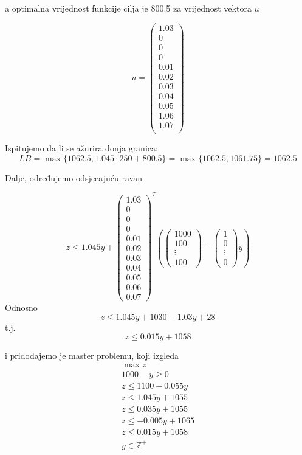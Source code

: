 \documentclass[a4paper, utf8, 11pt, colorlinks]{book}
\theoremstyle{definition}
\begin{document}
 a optimalna vrijednost funkcije cilja je 800.5 za vrijednost vektora $u$
 
 
 $$u=\left(\begin{array}{c}
 	1.03\\
 		0\\
 		0\\
 		0\\
 0.01\\
 0.02\\
 0.03\\
 0.04\\
 0.05\\
 	1.06\\
 	1.07 \\
 \end{array}\right)$$
 
 Ispitujemo da li se ažurira donja granica:
 $$LB = \max\{1062.5, 1.045\cdot 250+ 800.5\} = \max\{1062.5,1061.75\}=1062.5$$
 
 Dalje, određujemo odsjecajuću ravan
 
 
 $$z\leqslant 1.045y+\left(\begin{array}{c}
 	1.03 \\
 	0 \\
 	0\\
 	0\\
 	0.01\\
 	0.02\\
 	0.03\\
 	0.04\\
 	0.05\\
 	0.06\\
 	0.07
 \end{array}\right)^T
 \left(\left(\begin{array}{c}
 	1000 \\
 	100 \\
 	\vdots \\
 	100
 \end{array}\right)-\left(\begin{array}{c}
 	1 \\
 	0 \\
 	\vdots \\
 	0
 \end{array}\right)y\right)$$
 Odnosno 
 $$z\leqslant 1.045y+1030-1.03y+28$$
 t.j.
 $$z\leqslant 0.015y+1058$$
 
 i pridodajemo je master problemu, koji izgleda
  $$
 \begin{aligned}
 	\max z\\
 	1000-y\geqslant 0\\
 	z\leqslant 1100-0.055y\\ 
 	z\leqslant 1.045y+1055\\
 	z\leqslant 0.035y+1055\\
 	z\leqslant -0.005y+1065\\
 	z\leqslant 0.015y+1058\\
 	y\in\mathbb{Z}^+\\	
 \end{aligned}
 $$
 
\end{document}
